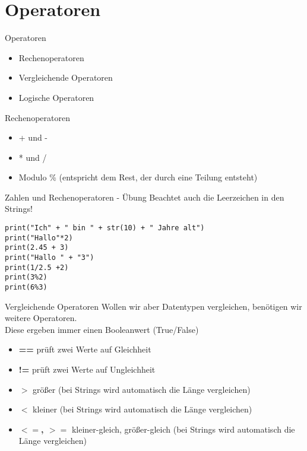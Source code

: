 \section{Operatoren}

\begin{frame}[fragile]{Operatoren}
\begin{itemize}
	\item Rechenoperatoren 
	\item Vergleichende Operatoren
	\item Logische Operatoren
\end{itemize}
\end{frame}

\begin{frame}[fragile]{Rechenoperatoren}
\begin{itemize}
\item + und -
\item * und /
\item Modulo \% (entspricht dem Rest, der durch eine Teilung entsteht)
\end{itemize}
\end{frame}


\begin{frame}[fragile]{Zahlen und Rechenoperatoren - Übung}
Beachtet auch die Leerzeichen in den Strings!
\begin{lstlisting}
print("Ich" + " bin " + str(10) + " Jahre alt") 
print("Hallo"*2)
print(2.45 + 3)
print("Hallo " + "3")
print(1/2.5 +2)
print(3%2)
print(6%3)
\end{lstlisting}
\end{frame}



\begin{frame}[fragile]{Vergleichende Operatoren}
Wollen wir aber Datentypen vergleichen, benötigen wir weitere Operatoren.\\
Diese ergeben immer einen Booleanwert (True/False)\\

\begin{itemize}
\item \textbf{==} prüft zwei Werte auf Gleichheit
\item \textbf{!=} prüft zwei Werte auf Ungleichheit
\item \textbf{$>$} größer (bei Strings wird automatisch die Länge vergleichen)
\item \textbf{$<$} kleiner (bei Strings wird automatisch die Länge vergleichen)
\item \textbf{$<=$, $>=$}  kleiner-gleich, größer-gleich (bei Strings wird automatisch die Länge vergleichen)

\end{itemize}
\end{frame}

